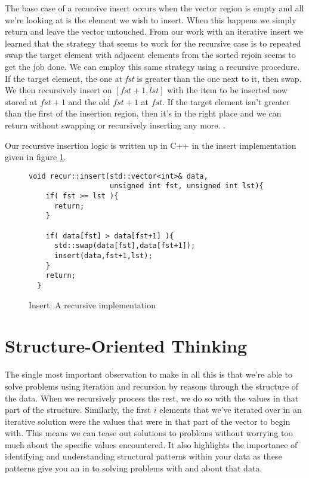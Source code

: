 \documentclass[]{tufte-handout}
\begin{document}
The base case of a recursive insert occurs when the vector region is empty and all we're looking at is the element we wish to insert. When this happens we simply return and leave the vector untouched. From our work with an iterative insert we learned that the strategy that seems to work for the recursive case is to repeated swap the target element with adjacent elements from the sorted rejoin seems to get the job done. We can employ this same strategy using a recursive procedure. If the target element, the one at \textit{fst} is greater than the one next to it, then swap. We then recursively insert on $[fst+1,lst]$ with the item to be inserted now stored at $fst+1$ and the old $fst+1$ at $fst$. If the target element isn't greater than the first of the insertion region, then it's in the right place and we can return without swapping or recursively inserting any more. .

Our recursive insertion logic is written up in C++ in the insert implementation given in figure \ref{code:insertrecipml}.
\begin{figure}[!htbp]
\begin{lstlisting}
void recur::insert(std::vector<int>& data,
	     	       unsigned int fst, unsigned int lst){
    if( fst >= lst ){
      return;
    }

    if( data[fst] > data[fst+1] ){
      std::swap(data[fst],data[fst+1]);
      insert(data,fst+1,lst);
    }
    return;
  }
\end{lstlisting}
\caption{Insert: A recursive implementation}
\label{code:insertrecipml}
\end{figure}

\section{Structure-Oriented Thinking}

The single most important observation to make in all this is that we're able to solve problems using iteration and recursion by reasons through the structure of the data.  When we recursively process the rest, we do so with the values in that part of the structure.  Similarly, the first $i$ elements that we've iterated over in an iterative solution were the values that were in that part of the vector to begin with. This means we can tease out solutions to problems without worrying too much about the specific values encountered. It also highlights the importance of identifying and understanding structural patterns within your data as these patterns give you an in to solving problems with and about that data.
\end{document}
